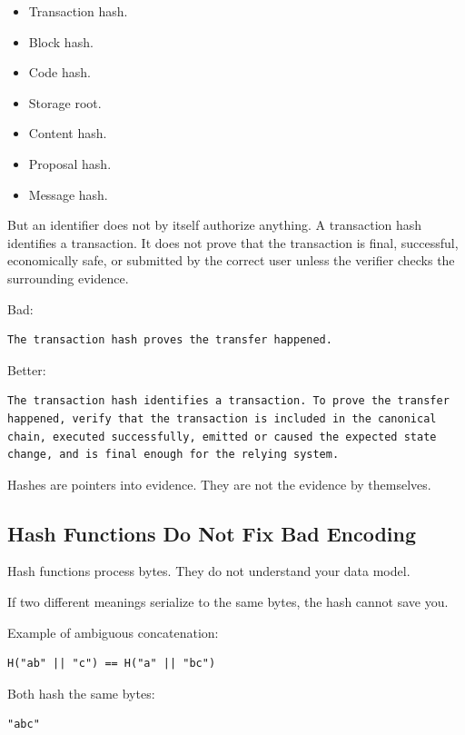 \begin{itemize}
\tightlist
\item
  Transaction hash.
\item
  Block hash.
\item
  Code hash.
\item
  Storage root.
\item
  Content hash.
\item
  Proposal hash.
\item
  Message hash.
\end{itemize}

But an identifier does not by itself authorize anything. A transaction
hash identifies a transaction. It does not prove that the transaction is
final, successful, economically safe, or submitted by the correct user
unless the verifier checks the surrounding evidence.

Bad:

\begin{lstlisting}
The transaction hash proves the transfer happened.
\end{lstlisting}

Better:

\begin{lstlisting}
The transaction hash identifies a transaction. To prove the transfer happened, verify that the transaction is included in the canonical chain, executed successfully, emitted or caused the expected state change, and is final enough for the relying system.
\end{lstlisting}

Hashes are pointers into evidence. They are not the evidence by
themselves.

\subsection{Hash Functions Do Not Fix Bad Encoding}

Hash functions process bytes. They do not understand your data model.

If two different meanings serialize to the same bytes, the hash cannot
save you.

Example of ambiguous concatenation:

\begin{lstlisting}
H("ab" || "c") == H("a" || "bc")
\end{lstlisting}

Both hash the same bytes:

\begin{lstlisting}
"abc"
\end{lstlisting}

